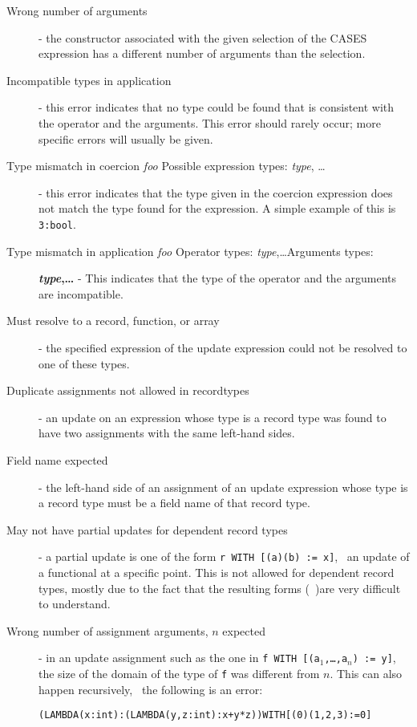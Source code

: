 \begin{description}
\item[Wrong number of arguments] - the constructor associated with the
given selection of the CASES expression has a different number of
arguments than the selection.

\item[Incompatible types in application] - this error indicates that no
type could be found that is consistent with the operator and the
arguments.  This error should rarely occur; more specific errors will
usually be given.

\item[Type mismatch in coercion \emph{foo} Possible expression types:
\emph{type}, \ldots] - this error indicates that the type given in the
coercion expression does not match the type found for the expression.  A
simple example of this is \texttt{3:bool}.

\item[Type mismatch in application \emph{foo} Operator types:
\emph{type},\ldots Arguments types:] \textbf{\emph{type},\ldots} - This indicates
that the type of the operator and the arguments are incompatible.

\item[Must resolve to a record, function, or array] - the specified
expression of the update expression could not be resolved to one of these
types.

\item[Duplicate assignments not allowed in recordtypes] - an update on an
expression whose type is a record type was found to have two assignments
with the same left-hand sides.

\item[Field name expected] - the left-hand side of an assignment of an
update expression whose type is a record type must be a field name of that
record type.

\item[May not have partial updates for dependent record types] - a partial
update is one of the form \texttt{r WITH [(a)(b) := x]}, \ie\ an update of
a functional at a specific point.  This is not allowed for dependent
record types, mostly due to the fact that the resulting forms (\eg\
\tccs)are very difficult to understand.

\item[Wrong number of assignment arguments, $n$ expected] - in an update
assignment such as the one in \texttt{f WITH [(a$_1$,\ldots,a$_n$) := y]},
the size of the domain of the type of {\tt f} was different from $n$.
This can also happen recursively, \eg\ the following is an error:
{\small
\begin{alltt}
  (LAMBDA (x:int): (LAMBDA (y,z:int): x + y * z)) WITH [(0)(1,2,3) := 0]
\end{alltt}}


\end{description}
